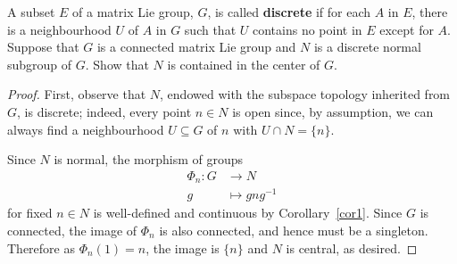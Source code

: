 \documentclass[10pt]{amsart}
\begin{document}
\begin{ex}
  A subset $E$ of a matrix Lie group, $G$, is called {\bf discrete} if for each $A$ in $E$, there is a neighbourhood $U$ of $A$ in $G$ such that $U$ contains no point in $E$ except for $A$.
  Suppose that $G$ is a connected matrix Lie group and $N$ is a discrete normal subgroup of $G$.
  Show that $N$ is contained in the center of $G$.
  \begin{proof}
    First, observe that $N$, endowed with the subspace topology inherited from $G$, is discrete; indeed, every point $n \in N$ is open since, by assumption, we can always find a neighbourhood $U \subseteq G$ of $n$ with $U \cap N = \{n\}$.
    
    Since $N$ is normal, the morphism of groups
    \begin{align*}
      \Phi_n \colon G &\rightarrow N\\
      g & \mapsto gng^{-1}
    \end{align*}  
    for fixed $n \in N$ is well-defined and continuous by Corollary~\ref{cor1}.
    Since $G$ is connected, the image of $\Phi_n$ is also connected, and hence must be a singleton.
    Therefore as $\Phi_n(1) = n$, the image is $\{n\}$ and $N$ is central, as desired.
  \end{proof}
\end{ex}
\end{document}

